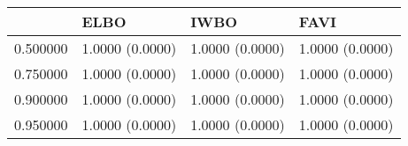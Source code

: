 \begin{tabular}{llll}
\toprule
 & ELBO & IWBO & FAVI \\
\midrule
0.500000 & 1.0000 (0.0000) & 1.0000 (0.0000) & 1.0000 (0.0000) \\
0.750000 & 1.0000 (0.0000) & 1.0000 (0.0000) & 1.0000 (0.0000) \\
0.900000 & 1.0000 (0.0000) & 1.0000 (0.0000) & 1.0000 (0.0000) \\
0.950000 & 1.0000 (0.0000) & 1.0000 (0.0000) & 1.0000 (0.0000) \\
\bottomrule
\end{tabular}

